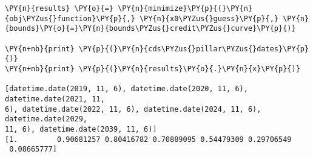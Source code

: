 \begin{Answer}
\begin{tcolorbox}[size=fbox, boxrule=1pt, pad at break*=1mm,colback=cellbackground, colframe=cellborder]
\begin{Verbatim}[commandchars=\\\{\}]
\PY{n}{results} \PY{o}{=} \PY{n}{minimize}\PY{p}{(}\PY{n}{obj\PYZus{}function}\PY{p}{,} \PY{n}{x0\PYZus{}guess}\PY{p}{,} \PY{n}{bounds}\PY{o}{=}\PY{n}{bounds\PYZus{}credit\PYZus{}curve}\PY{p}{)}

\PY{n+nb}{print} \PY{p}{(}\PY{n}{cds\PYZus{}pillar\PYZus{}dates}\PY{p}{)}
\PY{n+nb}{print} \PY{p}{(}\PY{n}{results}\PY{o}{.}\PY{n}{x}\PY{p}{)}

[datetime.date(2019, 11, 6), datetime.date(2020, 11, 6), datetime.date(2021, 11,
6), datetime.date(2022, 11, 6), datetime.date(2024, 11, 6), datetime.date(2029,
11, 6), datetime.date(2039, 11, 6)]
[1.         0.90681257 0.80416782 0.70889095 0.54479309 0.29706549
 0.08665777]
    \end{Verbatim}  
\end{tcolorbox}
\end{Answer}

